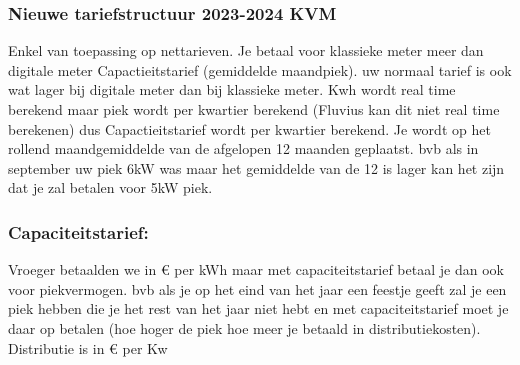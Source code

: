 \documentclass[12pt]{article}
\begin{document}
\subsubsection{Nieuwe tariefstructuur 2023-2024 KVM}
Enkel van toepassing op nettarieven. Je betaal voor klassieke meter meer dan digitale meter Capactieitstarief (gemiddelde maandpiek). uw normaal tarief is ook wat lager bij digitale meter dan bij klassieke meter. Kwh wordt real time berekend maar piek wordt per kwartier berekend (Fluvius kan dit niet real time berekenen) dus Capactieitstarief wordt per kwartier berekend. Je wordt op het rollend maandgemiddelde van de afgelopen 12 maanden geplaatst. bvb als in september uw piek 6kW was maar het gemiddelde van de 12 is lager kan het zijn dat je zal betalen voor 5kW piek.
\subsubsection{Capaciteitstarief:}
Vroeger betaalden we in € per kWh maar met capaciteitstarief betaal je dan ook voor piekvermogen. bvb als je op het eind van het jaar een feestje geeft zal je een piek hebben die je het rest van het jaar niet hebt en met capaciteitstarief moet je daar op betalen (hoe hoger de piek hoe meer je betaald in distributiekosten). Distributie is in € per Kw
\end{document}
